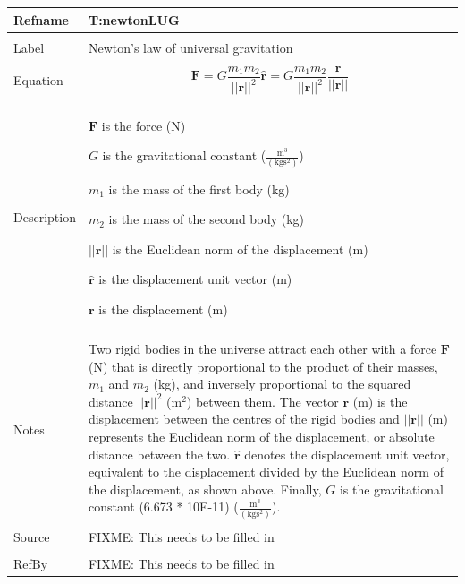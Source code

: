 \documentclass[12pt]{article}
\begin{document}
\noindent \begin{minipage}{\textwidth}
\begin{tabular}{p{} p{}}
\toprule \textbf{Refname} & \textbf{T:newtonLUG}
\label{T:newtonLUG}
\\ \midrule \\
Label & Newton's law of universal gravitation
\\ \midrule \\
Equation & \begin{dmath}
           \mathbf{F}=G \frac{{m_{1}} {m_{2}}}{||\mathbf{r}||^{2}} \mathbf{\hat{r}}=G \frac{{m_{1}} {m_{2}}}{||\mathbf{r}||^{2}} \frac{\mathbf{r}}{||\mathbf{r}||}
           \end{dmath}
\\ \midrule \\
Description & \begin{symbDescription}
              \item{$\mathbf{F}$ is the force (N)}
              \item{$G$ is the gravitational constant ($\frac{\text{m}^{3}}{(\text{kg}\text{s}^{2})}$)}
              \item{${m_{1}}$ is the mass of the first body (kg)}
              \item{${m_{2}}$ is the mass of the second body (kg)}
              \item{$||\mathbf{r}||$ is the Euclidean norm of the displacement (m)}
              \item{$\mathbf{\hat{r}}$ is the displacement unit vector (m)}
              \item{$\mathbf{r}$ is the displacement (m)}
              \end{symbDescription}
\\ \midrule \\
Notes & Two rigid bodies in the universe attract each other with a force $\mathbf{F}$ (N) that is directly proportional to the product of their masses, ${m_{1}}$ and ${m_{2}}$ (kg), and inversely proportional to the squared distance ${||\mathbf{r}||^{2}}$ ($\text{m}^{2}$) between them. The vector $\mathbf{r}$ (m) is the displacement between the centres of the rigid bodies and $||\mathbf{r}||$ (m) represents the Euclidean norm of the displacement, or absolute distance between the two. $\mathbf{\hat{r}}$ denotes the displacement unit vector, equivalent to the displacement divided by the Euclidean norm of the displacement, as shown above. Finally, $G$ is the gravitational constant (6.673 * 10E-11) ($\frac{\text{m}^{3}}{(\text{kg}\text{s}^{2})}$).
\\ \midrule \\
Source & FIXME: This needs to be filled in
\\ \midrule \\
RefBy & FIXME: This needs to be filled in
\\ \bottomrule \end{tabular}
\end{minipage}\\
\end{document}

